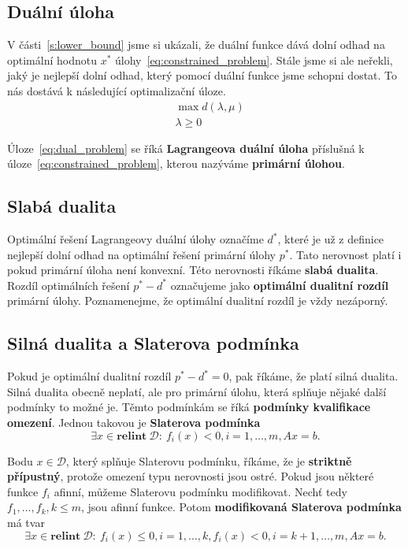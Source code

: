 \subsection{Duální úloha}

V části~\ref{s:lower_bound} jsme si ukázali, že duální funkce dává dolní odhad na optimální hodnotu $x^*$ úlohy~\ref{eq:constrained_problem}. Stále jsme si ale neřekli, jaký je nejlepší dolní odhad, který pomocí duální funkce jsme schopni dostat. To nás dostává k následující optimalizační úloze.
\begin{equation}\label{eq:dual_problem}
    \begin{split}
        &\max d(\lambda, \mu) \\
        &\lambda \geq 0
    \end{split}
\end{equation}

Úloze~\ref{eq:dual_problem} se říká \textbf{Lagrangeova duální úloha} příslušná k úloze~\ref{eq:constrained_problem}, kterou nazýváme \textbf{primární úlohou}.

\subsection{Slabá dualita}

Optimální řešení Lagrangeovy duální úlohy označíme $d^*$, které je už z definice nejlepší dolní odhad na optimální řešení primární úlohy $p^*$. Tato nerovnost platí i pokud primární úloha není konvexní. Této nerovnosti říkáme \textbf{slabá dualita}. Rozdíl optimálních řešení $p^* - d^*$ označujeme jako \textbf{optimální dualitní rozdíl} primární úlohy. Poznamenejme, že optimální dualitní rozdíl je vždy nezáporný.


\subsection{Silná dualita a Slaterova podmínka}

Pokud je optimální dualitní rozdíl $p^* - d^* = 0$, pak říkáme, že platí silná dualita. Silná dualita obecně neplatí, ale pro primární úlohu, která splňuje nějaké další podmínky to možné je. Těmto podmínkám se říká \textbf{podmínky kvalifikace omezení}. Jednou takovou je \textbf{Slaterova podmínka}
$$
    \exists x \in \textbf{relint}\ \mathcal{D}:\ f_i(x) < 0, i = 1, \dots, m, Ax = b.
$$

Bodu $x \in \mathcal{D}$, který splňuje Slaterovu podmínku, říkáme, že je \textbf{striktně přípustný}, protože omezení typu nerovnosti jsou ostré. Pokud jsou některé funkce $f_i$ afinní, můžeme Slaterovu podmínku modifikovat. Nechť tedy $f_1, \dots, f_k, k \leq m$, jsou afinní funkce. Potom \textbf{modifikovaná Slaterova podmínka} má tvar
$$
    \exists x \in \textbf{relint}\ \mathcal{D}:\ f_i(x) \leq 0, i = 1, \dots, k, f_i(x) < 0, i = k+1, \dots, m, Ax = b.
$$


